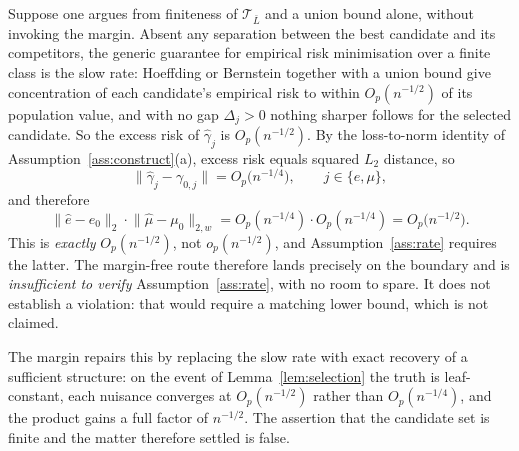\documentclass[11pt]{article}
\theoremstyle{plain}
\theoremstyle{definition}
\theoremstyle{remark}
\newcommand{\cT}{\mathcal{T}}
\newcommand{\ez}{e_0}
\newcommand{\mz}{\mu_0}
\newcommand{\ehat}{\widehat{e}}
\newcommand{\mhat}{\widehat{\mu}}
\newcommand{\Ltwo}[1]{\lVert #1 \rVert_{2}}
\newcommand{\Lw}[1]{\lVert #1 \rVert_{2,w}}
\begin{document}
Suppose one argues from finiteness of $\cT_{\bar L}$ and a union bound alone,
without invoking the margin. Absent any separation between the best candidate and
its competitors, the generic guarantee for empirical risk minimisation over a
finite class is the slow rate: Hoeffding or Bernstein together with a union bound
give concentration of each candidate's empirical risk to within $O_p(n^{-1/2})$ of
its population value, and with no gap $\Delta_j>0$ nothing sharper follows for the
selected candidate. So the excess risk of $\widehat\gamma_j$ is $O_p(n^{-1/2})$.
By the loss-to-norm identity of Assumption~\ref{ass:construct}(a), excess risk
equals squared $L_2$ distance, so
\[
  \bigl\lVert\widehat\gamma_j-\gamma_{0,j}\bigr\rVert
  =O_p\bigl(n^{-1/4}\bigr),\qquad j\in\{e,\mu\},
\]
and therefore
\[
  \Ltwo{\ehat-\ez}\cdot\Lw{\mhat-\mz}
  =O_p(n^{-1/4})\cdot O_p(n^{-1/4})=O_p\bigl(n^{-1/2}\bigr).
\]
This is \emph{exactly} $O_p(n^{-1/2})$, not $o_p(n^{-1/2})$, and
Assumption~\ref{ass:rate} requires the latter. The margin-free route therefore
lands precisely on the boundary and is \emph{insufficient to verify}
Assumption~\ref{ass:rate}, with no room to spare. It does not establish a
violation: that would require a matching lower bound, which is not claimed.

The margin repairs this by replacing the slow rate with exact recovery of a
sufficient structure: on the event of Lemma~\ref{lem:selection} the truth is
leaf-constant, each nuisance converges at $O_p(n^{-1/2})$ rather than
$O_p(n^{-1/4})$, and the product gains a full factor of $n^{-1/2}$. The assertion
that the candidate set is finite and the matter therefore settled is false.
\end{document}
